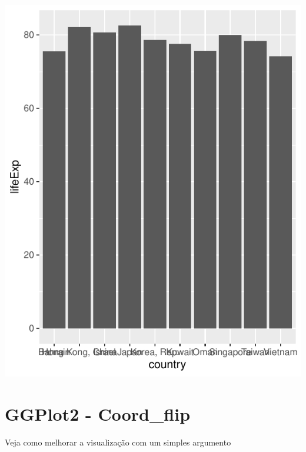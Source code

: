 \documentclass[
]{article}
\newenvironment{Shaded}{\begin{snugshade}}{\end{snugshade}}
\newcommand{\DataTypeTok}[1]{\textcolor[rgb]{0.13,0.29,0.53}{#1}}
\newcommand{\DecValTok}[1]{\textcolor[rgb]{0.00,0.00,0.81}{#1}}
\newcommand{\KeywordTok}[1]{\textcolor[rgb]{0.13,0.29,0.53}{\textbf{#1}}}
\newcommand{\NormalTok}[1]{#1}
\newcommand{\OperatorTok}[1]{\textcolor[rgb]{0.81,0.36,0.00}{\textbf{#1}}}
\newcommand{\StringTok}[1]{\textcolor[rgb]{0.31,0.60,0.02}{#1}}
\begin{document}
\begin{center}\includegraphics{arquivo_pdf_files/figure-latex/barras-1} \end{center}

\hypertarget{ggplot2---coord_flip}{%
\section{GGPlot2 - Coord\_flip}\label{ggplot2---coord_flip}}

Veja como melhorar a visualização com um simples argumento

\begin{Shaded}
\end{Shaded}
\end{document}
